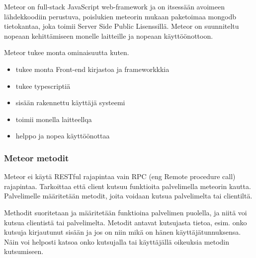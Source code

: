 \documentclass[11pt,a4paper,titlepage,oneside]{article}
\begin{document}
Meteor on full-stack JavaScript web-framework ja on itsessään avoimeen lähdekkoodiin perustuva, 
poislukien meteorin mukaan paketoimaa mongodb tietokantaa, joka toimii Server Side Public Lisenssillä.
Meteor on suunniteltu nopeaan kehittämiseen monelle laitteille ja nopeaan käyttöönottoon.
%
\medskip


    

Meteor tukee monta ominaisuutta kuten.
\begin{itemize}
    \item tukee monta Front-end kirjastoa ja frameworkkkia
    \item tukee typescriptiä
    \item sisään rakennettu käyttäjä systeemi
    \item toimii monella laitteellqa
    \item helppo ja nopea käyttöönottaa 
\end{itemize}




\subsubsection{Meteor metodit}






Meteor ei käytä RESTful rajapintaa vain RPC (eng Remote procedure call) rajapintaa. 
Tarkoittaa että client kutsuu funktioita palvelimella meteorin kautta.
Palvelimelle määritetään metodit, joita voidaan kutsua palvelimelta tai clientiltä.




\medskip


Methodit suoritetaan ja määritetään funktioina palvelimen puolella, ja niitä voi kutsua clientistä tai palvelimelta.
Metodit antavat kutsujasta tietoa, esim. onko kutsuja kirjautunut sisään ja jos on niin mikä on hänen käyttäjätunnuksensa. 
Näin voi helposti katsoa onko kutsujalla tai käyttäjällä oikeuksia metodin kutsumiseen.
\end{document}
